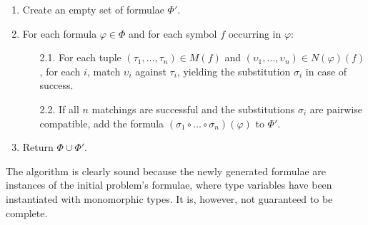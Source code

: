 \documentclass[runningheads]{llncs}
\begin{document}
\begin{enumerate}

   \item Create an empty set of formulae \(\Phi'\).

   \item For each formula \(\varphi \in \Phi\) and for each symbol \(f\) occurring in \(\varphi\):
   \begin{enumerate}
    \item[2.1.] For each tuple \((\tau_1, \dots, \tau_n) \in  M(f)\) and \((\upsilon_1, \dots, \upsilon_n) \in N(\varphi)(f)\),
     for each \(i\), match \(\upsilon_i\) against \(\tau_i\), yielding the substitution \(\sigma_i\) in case of success.

    \item[2.2.] If all \(n\) matchings are successful and the substitutions \(\sigma_i\) are pairwise compatible,
add the formula \((\sigma_1 \circ \dots \circ \sigma_n)(\varphi)\) to \(\Phi'\).
   \end{enumerate}

   \item Return \(\Phi \cup \Phi'\).

\end{enumerate}

The algorithm is clearly sound because the newly generated formulae are instances of the initial problem's formulae, where type variables have been instantiated with monomorphic types. It is, however, not guaranteed to be complete.
\end{document}
